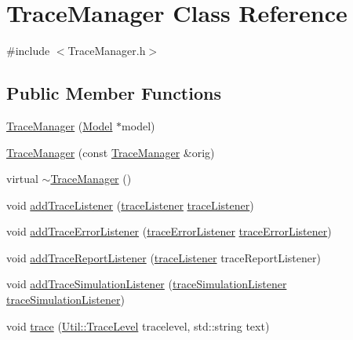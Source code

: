 \hypertarget{class_trace_manager}{}\section{Trace\+Manager Class Reference}
\label{class_trace_manager}


{\ttfamily \#include $<$Trace\+Manager.\+h$>$}

\subsection*{Public Member Functions}
\begin{DoxyCompactItemize}
\item 
\hyperlink{class_trace_manager_ae3cb94c21a56691462d818ae8acd30cf}{Trace\+Manager} (\hyperlink{class_model}{Model} $\ast$model)
\item 
\hyperlink{class_trace_manager_af3564e61b170274e281ff6265c36e31a}{Trace\+Manager} (const \hyperlink{class_trace_manager}{Trace\+Manager} \&orig)
\item 
virtual \hyperlink{class_trace_manager_a0f0988540948118357e571343d8fc48f}{$\sim$\+Trace\+Manager} ()
\item 
void \hyperlink{class_trace_manager_a73ff0914b70780d4a7ef6336a7cf75d8}{add\+Trace\+Listener} (\hyperlink{_trace_manager_8h_a1136585847f84bdff0c8d3e7fef53d50}{trace\+Listener} \hyperlink{_trace_manager_8h_a1136585847f84bdff0c8d3e7fef53d50}{trace\+Listener})
\item 
void \hyperlink{class_trace_manager_a55c6d2c1ba87272b81a6384e3b39ddba}{add\+Trace\+Error\+Listener} (\hyperlink{_trace_manager_8h_acbbf973df10808566f22d73581076abd}{trace\+Error\+Listener} \hyperlink{_trace_manager_8h_acbbf973df10808566f22d73581076abd}{trace\+Error\+Listener})
\item 
void \hyperlink{class_trace_manager_a5479d4665fdf4f11d54c718d4ce84ffe}{add\+Trace\+Report\+Listener} (\hyperlink{_trace_manager_8h_a1136585847f84bdff0c8d3e7fef53d50}{trace\+Listener} trace\+Report\+Listener)
\item 
void \hyperlink{class_trace_manager_a75f2f2e8aaf4f69767a51c0b5d261233}{add\+Trace\+Simulation\+Listener} (\hyperlink{_trace_manager_8h_a103daf352a5c1b34d88af32d716bce7e}{trace\+Simulation\+Listener} \hyperlink{_trace_manager_8h_a103daf352a5c1b34d88af32d716bce7e}{trace\+Simulation\+Listener})
\item 
void \hyperlink{class_trace_manager_a242d77829b85a436fd2aab2092bfa50c}{trace} (\hyperlink{class_util_a0a3482cfa2d915e261c0cf528fdc7afc}{Util\+::\+Trace\+Level} tracelevel, std\+::string text)

\end{DoxyCompactItemize}
